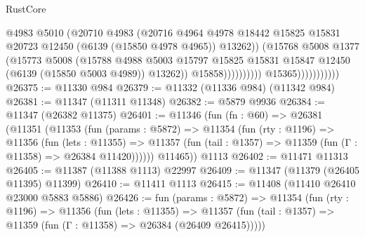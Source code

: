 \begin{lexlean}{RustCore}
\begin{coremodule}
                                            @4983
                                            @5010
                                            (@20710
                                              @4983
                                              (@20716
                                                @4964
                                                @4978
                                                @18442
                                                @15825
                                                @15831
                                                @20723
                                                @12450
                                                (@6139 (@15850 @4978 @4965))
                                                @13262))
                                            (@15768
                                              @5008
                                              @1377
                                              (@15773
                                                @5008
                                                (@15788
                                                  @4988
                                                  @5003
                                                  @15797
                                                  @15825
                                                  @15831
                                                  @15847
                                                  @12450
                                                  (@6139 (@15850 @5003 @4989))
                                                  @13262))
                                              @15858))))))))))
                          @15365)))))))))))
@26375 := @11330 @984
@26379 := @11332 (@11336 @984) (@11342 @984)
@26381 := @11347 (@11311 @11348)
@26382 := @5879 @9936
@26384 := @11347 (@26382 @11375)
@26401 := @11346
    (fun (fn : @60) =>
    @26381
      (@11351
        (@11353
          (fun (params : @5872) =>
          @11354
            (fun (rty : @1196) =>
            @11356
              (fun (lets : @11355) =>
              @11357 (fun (tail : @1357) => @11359 (fun (Γ : @11358) => @26384 @11420))))))
        @11465))
    @1113
@26402 := @11471 @11313
@26405 := @11387 (@11388 @1113) @22997
@26409 := @11347 (@11379 (@26405 @11395) @11399)
@26410 := @11411 @1113
@26415 := @11408 (@11410 @26410 @23000 @5883 @5886)
@26426 := fun (params : @5872) =>
  @11354
    (fun (rty : @1196) =>
    @11356
      (fun (lets : @11355) =>
      @11357 (fun (tail : @1357) => @11359 (fun (Γ : @11358) => @26384 (@26409 @26415)))))

\end{coremodule}
\end{lexlean}
